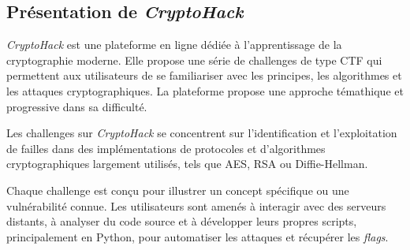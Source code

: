 \subsection{Présentation de \textit{CryptoHack}}
\textit{CryptoHack} est une plateforme en ligne dédiée à l'apprentissage de la
cryptographie moderne. Elle propose une série de challenges de type CTF qui
permettent aux utilisateurs de se familiariser avec les principes, les
algorithmes et les attaques cryptographiques. La plateforme propose une approche 
témathique et progressive dans sa difficulté.

Les challenges sur \textit{CryptoHack} se concentrent sur l'identification et
l'exploitation de failles dans des implémentations de protocoles et
d'algorithmes cryptographiques largement utilisés, tels que AES, RSA ou
Diffie-Hellman.

Chaque challenge est conçu pour illustrer un concept
spécifique ou une vulnérabilité connue. Les utilisateurs sont amenés à
interagir avec des serveurs distants, à analyser du code source et à
développer leurs propres scripts, principalement en Python, pour automatiser
les attaques et récupérer les \textit{flags}.

